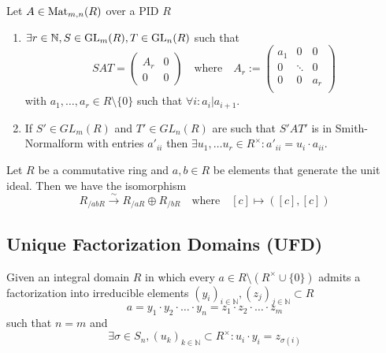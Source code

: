 \begin{theorem}
   Let \(A \in \operatorname{Mat}_{m,n}(R)\) over a PID \(R\)
   \begin{enumerate}[label=\roman*, align=Center]
      \item \(\exists r \in \mathbb{N}, S \in \operatorname{GL}_m(R), T \in \operatorname{GL}_n(R)\) such that
         \[SAT = \left(\begin{array}{c|c} A_r & 0\\ \hline 0 & 0 \end{array}\right) \quad\text{where}\quad
            A_r := \begin{pmatrix}
               a_1 & 0      & 0 \\
               0   & \ddots & 0 \\
               0   & 0      & a_r \\
         \end{pmatrix}\]
         with \(a_1, \ldots, a_r \in R \setminus \{0\}\) such that \(\forall i: a_i | a_{i+1}\).
      \item  If \(S' \in GL_m(R)\) and \(T' \in GL_n(R)\) are such that \(S'AT'\) is in Smith-Normalform with entries \(a'_{ii}\) then \(\exists u_1, \ldots u_r \in R^\times: a'_{ii} = u_i \cdot a_{ii}\).
   \end{enumerate}
\end{theorem}

\begin{lemma}
   Let \(R\) be a commutative ring and \(a, b \in R\) be elements that generate the unit ideal.
   Then we have the isomorphism
   \[R_{/abR} \xrightarrow{\sim} R_{/aR} \oplus R_{/bR} \quad\text{where}\quad [c] \mapsto ([c], [c])\]
\end{lemma}

\begin{theorem}
\end{theorem}

\subsection{Unique Factorization Domains (UFD)}
\begin{definition}\label{def:ufd}
   Given an integral domain \(R\) in which every \(a \in R \setminus (R^\times \cup \{0\})\) admits a factorization into irreducible elements \((y_i)_{i \in \mathbb{N}}, (z_j)_{j \in \mathbb{N}} \subset R\)
   \[a = y_1 \cdot y_2 \cdot \ldots \cdot y_n = z_1 \cdot z_2 \cdot \ldots \cdot z_m\]
   such that \(n = m\) and
   \[\exists \sigma \in S_n, (u_k)_{k \in \mathbb{N}} \subset R^\times: u_i \cdot y_i = z_{\sigma(i)}\]
\end{definition}

